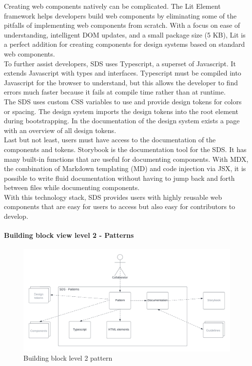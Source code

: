 Creating web components natively can be complicated. The Lit Element framework helps developers build web components by eliminating some of the pitfalls of implementing web components from scratch. With a focus on ease of understanding, intelligent DOM updates, and a small package size (5 KB), Lit is a perfect addition for creating components for design systems based on standard web components. \citep{lit_nodate} \\

To further assist developers, \ac{SDS} uses Typescript, a superset of Javascript. It extends Javascript with types and interfaces. Typescript must be compiled into Javascript for the browser to understand, but this allows the developer to find errors much faster because it fails at compile time rather than at runtime. \citep{microsoft_typescript_nodate} \\

The \ac{SDS} uses custom CSS variables to use and provide design tokens for colors or spacing. The design system imports the design tokens into the root element during bootstrapping. In the documentation of the design system exists a page with an overview of all design tokens. \citep{mdn_css_vars_nodate} \\

Last but not least, users must have access to the documentation of the components and tokens. Storybook is the documentation tool for the \ac{SDS}. It has many built-in functions that are useful for documenting components. With MDX, the combination of Markdown templating (MD) and code injection via JSX, it is possible to write fluid documentation without having to jump back and forth between files while documenting components. \citep{otander_markdown_2017} \\

With this technology stack, \ac{SDS} provides users with highly reusable web components that are easy for users to access but also easy for contributors to develop.
\paragraph{Building block view level 2 - Patterns}
\begin{figure}[htbp]
    \centerline{
    \includegraphics[width=\linewidth]{images/building_block_view_level_2_pattern.png}}
\caption{Building block level 2 pattern}
\label{building_block_level_2_pattern_sds}
\end{figure}



